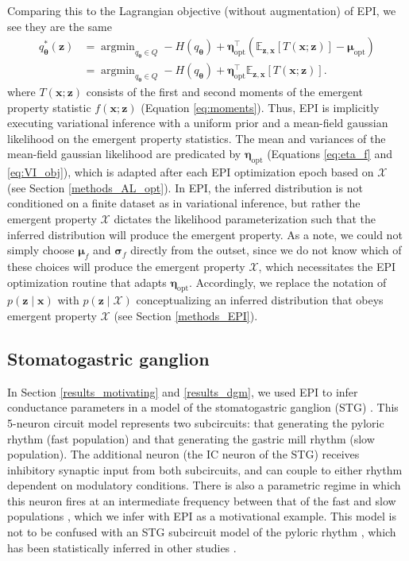 \documentclass[11pt]{article}
\DeclareMathOperator*{\argmin}{argmin}
\begin{document}
Comparing this to the Lagrangian objective (without augmentation) of EPI, we see they are the same
\begin{equation}
\begin{split}
q_{\bm{\theta}}^*(\mathbf{z}) &= \argmin_{q_{\bm{\theta}} \in Q} - H(q_{\bm{\theta}}) + \bm{\eta}_{\text{opt}}^\top \left(\mathbb{E}_{\mathbf{z}, \mathbf{x}} \left[T(\mathbf{x}; \mathbf{z}) \right] - \bm{\mu}_{\text{opt}} \right) \\
 &= \argmin_{q_{\bm{\theta}} \in Q} - H(q_{\bm{\theta}}) + \bm{\eta}_{\text{opt}}^\top \mathbb{E}_{\mathbf{z}, \mathbf{x}} \left[T(\mathbf{x}; \mathbf{z}) \right].
\end{split}
\end{equation}
where $T(\mathbf{x}; \mathbf{z})$ consists of the first and second moments of the emergent property statistic $f(\mathbf{x}; \mathbf{z})$ (Equation \ref{eq:moments}).
Thus, EPI is implicitly executing variational inference with a uniform prior and a mean-field gaussian likelihood on the emergent property statistics.
The mean and variances of the mean-field gaussian likelihood are predicated by $\bm{\eta}_{\text{opt}}$ (Equations \ref{eq:eta_f} and \ref{eq:VI_obj}), which is adapted after each EPI optimization epoch based on $\mathcal{X}$ (see Section \ref{methods_AL_opt}).
In EPI, the inferred distribution is not conditioned on a finite dataset as in variational inference, but rather the emergent property $\mathcal{X}$ dictates the likelihood parameterization such that the inferred distribution will produce the emergent property.
As a note, we could not simply choose $\bm{\mu}_f$ and $\bm{\sigma}_f$ directly from the outset, since we do not know which of these choices will produce the emergent property $\mathcal{X}$, which necessitates the EPI optimization routine that adapts $\bm{\eta}_{\text{opt}}$.
Accordingly, we replace the notation of $p(\mathbf{z} \mid \mathbf{x})$ with $p(\mathbf{z} \mid \mathcal{X})$ conceptualizing an inferred distribution that obeys emergent property $\mathcal{X}$ (see Section \ref{methods_EPI}). 

\subsection{Stomatogastric ganglion}\label{methods_STG}
In Section \ref{results_motivating} and \ref{results_dgm}, we used EPI to infer conductance parameters in a model of the stomatogastric ganglion (STG) \cite{gutierrez2013multiple}.
This 5-neuron circuit model represents two subcircuits: that generating the pyloric rhythm (fast population) and that generating the gastric mill rhythm (slow population).
The additional neuron (the IC neuron of the STG) receives inhibitory synaptic input from both subcircuits, and can couple to either rhythm dependent on  modulatory conditions.
There is also a parametric regime in which this neuron fires at an intermediate frequency between that of the fast and slow populations \cite{gutierrez2013multiple}, which we infer with EPI as a motivational example.
This model is not to be confused with an STG subcircuit model of the pyloric rhythm \cite{marder1992dynamic}, which has been statistically inferred in other studies \cite{prinz2004similar, gonccalves2019training}.
\end{document}
